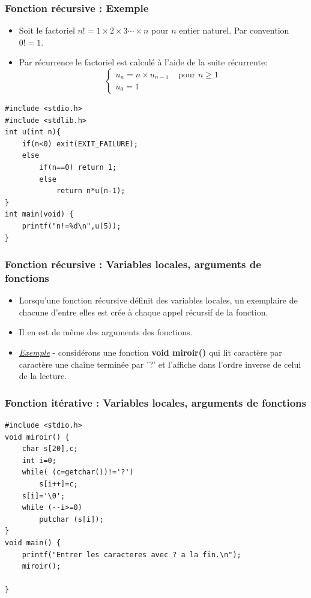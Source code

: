 \documentclass{beamer}
\begin{document}
\begin{frame}[fragile]
\frametitle{Fonction récursive : Exemple}
 
\begin{itemize}
\item Soit le factoriel $n!=1\times 2\times 3 \cdots \times n$ pour $n$ entier naturel. Par convention $0!=1$.
\item Par récurrence le factoriel est calculé à l'aide de la suite récurrente:
\[\left\{\begin{array}{ll}
u_n=n\times u_{n-1} & \mbox{ pour } n\geq 1\\
u_0 =1&
\end{array}\right.
\]
\end{itemize}
\begin{verbatim}
#include <stdio.h> 
#include <stdlib.h>
int u(int n){
    if(n<0) exit(EXIT_FAILURE);
    else
        if(n==0) return 1;
        else
            return n*u(n-1);
}
int main(void) {
    printf("n!=%d\n",u(5));	
}
\end{verbatim}

\end{frame}

\begin{frame}[fragile]
\frametitle{Fonction récursive : Variables locales, arguments de fonctions}
 
\begin{itemize}
\item Lorsqu'une fonction récursive définit des variables locales, un exemplaire de chacune d'entre elles est crée à chaque appel récursif de la fonction. 
\item Il en est de même des arguments des fonctions.
\item \underline {\em Exemple} - considérons une fonction {\bf void  miroir()} qui lit caractère par caractère une chaîne terminée par '?' et l'affiche dans l'ordre inverse de celui de la lecture.
\end{itemize}


\end{frame}


\begin{frame}[fragile]
\frametitle{Fonction itérative : Variables locales, arguments de fonctions}
 
\begin{verbatim}
#include <stdio.h> 
void miroir() { 
    char s[20],c; 
    int i=0; 
    while( (c=getchar())!='?') 
        s[i++]=c; 
    s[i]='\0'; 
    while (--i>=0) 
        putchar (s[i]); 
}
void main() { 
    printf("Entrer les caracteres avec ? a la fin.\n"); 
    miroir(); 
    
}

\end{verbatim}

\end{frame}
\end{document}
